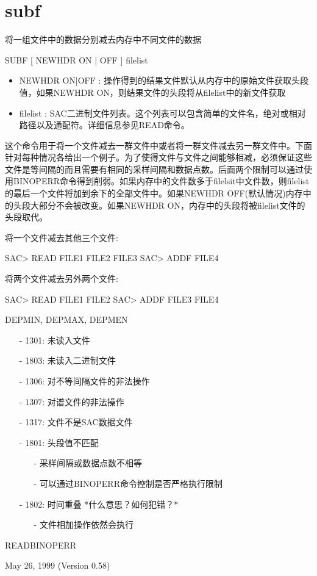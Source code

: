\section{subf}
\label{cmd:subf}

将一组文件中的数据分别减去内存中不同文件的数据

SUBF [ NEWHDR ON | OFF ] filelist

\begin{itemize}
\item NEWHDR ON|OFF : 操作得到的结果文件默认从内存中的原始文件获取头段值，如果NEWHDR ON，则结果文件的头段将从filelist中的新文件获取 
\item filelist : SAC二进制文件列表。这个列表可以包含简单的文件名，绝对或相对路径以及通配符。详细信息参见READ命令。 
\end{itemize}

这个命令用于将一个文件减去一群文件中或者将一群文件减去另一群文件中。下面针对每种情况各给出一个例子。为了使得文件与文件之间能够相减，必须保证这些文件是等间隔的而且需要有相同的采样间隔和数据点数。后面两个限制可以通过使用BINOPERR命令得到削弱。如果内存中的文件数多于filelsit中文件数，则filelist	的最后一个文件将加到余下的全部文件中。如果NEWHDR OFF(默认情况)内存中的头段大部分不会被改变。如果NEWHDR ON，内存中的头段将被filelist文件的头段取代。


将一个文件减去其他三个文件:
\begin{SACCode}
SAC> READ FILE1 FILE2 FILE3
SAC> ADDF FILE4
\end{SACCode}
将两个文件减去另外两个文件:
\begin{SACCode}
SAC> READ FILE1 FILE2
SAC> ADDF FILE3 FILE4
\end{SACCode}

DEPMIN, DEPMAX, DEPMEN

\begin{itemize}
\item[-]1301: 未读入文件
\item[-]1803: 未读入二进制文件
\item[-]1306: 对不等间隔文件的非法操作
\item[-]1307: 对谱文件的非法操作
\item[-]1317: 文件不是SAC数据文件
\item[-]1801: 头段值不匹配
	\begin{itemize}
	\item[-]采样间隔或数据点数不相等
	\item[-]可以通过BINOPERR命令控制是否严格执行限制
	\end{itemize}
\end{itemize}

\begin{itemize}
\item[-]1802: 时间重叠  *什么意思？如何犯错？*
	\begin{itemize}
	\item[-]文件相加操作依然会执行
	\end{itemize}
\end{itemize}

READBINOPERR

May 26, 1999 (Version 0.58)
